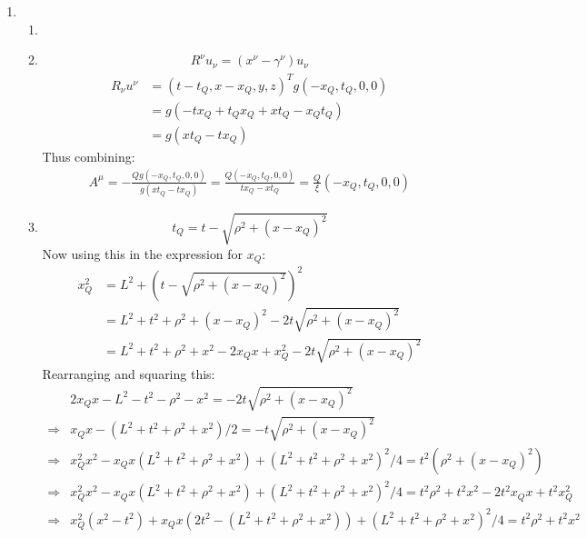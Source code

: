 \documentclass[12pt,a4]{article}
\begin{document}
\begin{enumerate}
  \item
    \begin{enumerate}
      \item
      \item
        \begin{align*}
          R^\nu u_\nu = (x^\nu - \gamma^\nu)u_\nu
        \end{align*}
        \begin{align*}
          R_\nu u^\nu &= (t - t_Q, x - x_Q, y, z)^T g (-x_Q, t_Q, 0, 0)\\
                      &= g(-t x_Q + t_Qx_Q +x t_Q - x_Qt_Q)\\
                      &= g(x t_Q -t x_Q)
        \end{align*}
        Thus combining:
        \begin{align*}
          A^\mu = - \frac{Q g (-x_Q, t_Q, 0, 0)}{g(x t_Q -t x_Q)} = \frac{Q  (-x_Q, t_Q, 0, 0)}{t x_Q - x t_Q} = \frac{Q}{\xi} (-x_Q, t_Q, 0, 0)
        \end{align*}
      \item
        \begin{equation*}
          t_Q = t - \sqrt{\rho^2 + (x - x_Q)^2}
        \end{equation*}
        Now using this in the expression for $x_Q$:
        \begin{align*}
          x_Q^2 &= L^2 + \left(t - \sqrt{\rho^2 + (x - x_Q)^2}\right)^2\\
                &= L^2 + t^2 + \rho^2 + (x - x_Q)^2 - 2 t \sqrt{\rho^2 + (x - x_Q)^2}\\
                &= L^2 + t^2 + \rho^2 + x^2 - 2x_Qx + x_Q^2 - 2 t \sqrt{\rho^2 + (x - x_Q)^2}
        \end{align*}
        Rearranging and squaring this:
        \begin{align*}
                      & 2x_Qx - L^2 - t^2 - \rho^2 - x^2 = -2 t \sqrt{\rho^2 + (x - x_Q)^2}\\
          \Rightarrow & x_Qx - (L^2 + t^2 + \rho^2 + x^2)/2 = - t \sqrt{\rho^2 + (x - x_Q)^2}\\
          \Rightarrow & x_Q^2x^2 - x_Qx (L^2 + t^2 + \rho^2 + x^2) + (L^2 + t^2 + \rho^2 + x^2)^2/4 = t^2 (\rho^2 + (x - x_Q)^2)\\
          \Rightarrow & x_Q^2x^2 - x_Qx (L^2 + t^2 + \rho^2 + x^2) + (L^2 + t^2 + \rho^2 + x^2)^2/4 = t^2 \rho^2 + t^2 x^2 - 2 t^2x_Qx + t^2x_Q^2\\
          \Rightarrow & x_Q^2(x^2 - t^2) + x_Qx (2t^2 - (L^2 + t^2 + \rho^2 + x^2)) + (L^2 + t^2 + \rho^2 + x^2)^2/4 = t^2 \rho^2 + t^2 x^2 \\

\end{align*}
\end{enumerate}
\end{enumerate}
\end{document}
